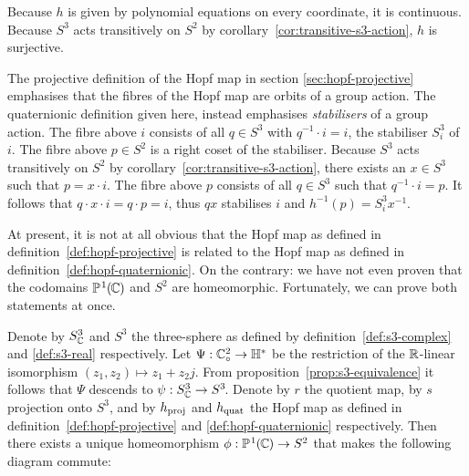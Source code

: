 Because $h$ is given by polynomial equations on every coordinate,
it is continuous.
Because $S^3$ acts transitively on $S^2$ by corollary~\ref{cor:transitive-s3-action},
$h$ is surjective.

The projective definition of the Hopf map in section \ref{sec:hopf-projective}
emphasises that the fibres of the Hopf map are orbits of a group action.
The quaternionic definition given here,
instead emphasises \emph{stabilisers} of a group action.
The fibre above $i$ consists of all $q \in S^3$ with $q^{-1} \cdot i = i$,
the stabiliser $S^3_i$ of $i$.
The fibre above $p \in S^2$ is a right coset of the stabiliser.
Because $S^3$ acts transitively on $S^2$ by corollary~\ref{cor:transitive-s3-action},
there exists an $x \in S^3$ such that $p = x \cdot i$.
The fibre above $p$ consists of all $q \in S^3$ such that $q^{-1} \cdot i = p$.
It follows that $q \cdot x \cdot i = q \cdot p = i$,
thus $qx$ stabilises $i$ and $h^{-1}(p) = S^3_i x^{-1}$.

At present, it is not at all obvious that the Hopf map as defined in
definition~\ref{def:hopf-projective} is related to the Hopf map as defined in definition~\ref{def:hopf-quaternionic}.
On the contrary: we have not even proven that the codomains $\mathbb{P}^{\hspace{0.8pt}1}\hspace{-0.3pt}(\hspace{-0.7pt}\mathbb{C}\hspace{-0.3pt})$ and $S^2$ are homeomorphic.
Fortunately, we can prove both statements at once.

Denote by $S^3_{\mathbb{C}}$ and $S^3$ the three-sphere as defined by
definition~\ref{def:s3-complex} and \ref{def:s3-real} respectively.
Let $\Psi : \mathbb{C}^2_\circ \to \mathbb{H}^*$ be the restriction
of the $\mathbb{R}$-linear isomorphism $(z_1, z_2) \mapsto z_1 + z_2 j$.
From proposition~\ref{prop:s3-equivalence} it follows that
$\Psi$ descends to $\psi : S^3_{\mathbb{C}} \to S^3\!$.
Denote by $r$ the quotient map,
by $s$ projection onto $S^3\!$,
and by $h_\textup{proj}$ and $h_\textup{quat}$ the Hopf map as defined in
definition~\ref{def:hopf-projective} and \ref{def:hopf-quaternionic} respectively.
Then there exists a unique homeomorphism $\phi : \mathbb{P}^{\hspace{0.8pt}1}\hspace{-0.3pt}(\hspace{-0.7pt}\mathbb{C}\hspace{-0.3pt}) \to S^2$
that makes the following diagram commute:

\begin{center}
\end{center}

